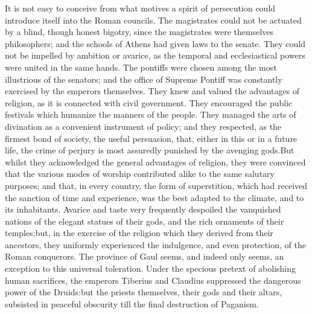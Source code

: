 It is not easy to conceive from what motives a spirit of
persecution could introduce itself into the Roman councils. The
magistrates could not be actuated by a blind, though honest
bigotry, since the magistrates were themselves philosophers; and
the schools of Athens had given laws to the senate. They could
not be impelled by ambition or avarice, as the temporal and
ecclesiastical powers were united in the same hands. The pontiffs
were chosen among the most illustrious of the senators; and the
office of Supreme Pontiff was constantly exercised by the
emperors themselves. They knew and valued the advantages of
religion, as it is connected with civil government. They
encouraged the public festivals which humanize the manners of the
people. They managed the arts of divination as a convenient
instrument of policy; and they respected, as the firmest bond of
society, the useful persuasion, that, either in this or in a
future life, the crime of perjury is most assuredly punished by
the avenging gods.\footnotemark[9] But whilst they acknowledged the general
advantages of religion, they were convinced that the various
modes of worship contributed alike to the same salutary purposes;
and that, in every country, the form of superstition, which had
received the sanction of time and experience, was the best
adapted to the climate, and to its inhabitants. Avarice and taste
very frequently despoiled the vanquished nations of the elegant
statues of their gods, and the rich ornaments of their temples;\footnotemark[10]
but, in the exercise of the religion which they derived from
their ancestors, they uniformly experienced the indulgence, and
even protection, of the Roman conquerors. The province of Gaul
seems, and indeed only seems, an exception to this universal
toleration. Under the specious pretext of abolishing human
sacrifices, the emperors Tiberius and Claudius suppressed the
dangerous power of the Druids:\footnotemark[11] but the priests themselves,
their gods and their altars, subsisted in peaceful obscurity till
the final destruction of Paganism.\footnotemark[12]




